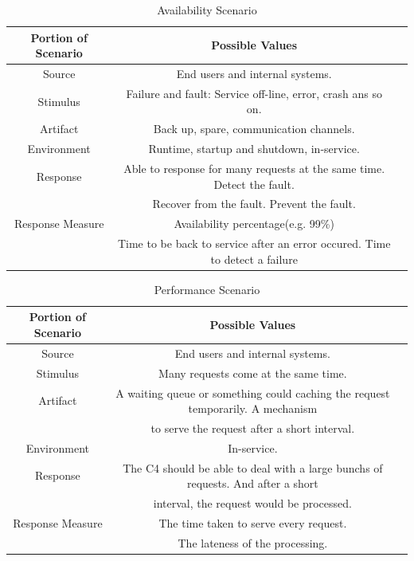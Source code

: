\documentclass{article}
\begin{document}
	\begin{center}
		\begin{table}[!htb]
		\begin{tabular}{ccc}
		\toprule  
		Portion of Scenario & Possible Values\\
		\midrule 
		Source & End users and internal systems.\\
		Stimulus & Failure and fault: Service off-line, error, crash ans so on.\\
		Artifact & Back up, spare, communication channels.\\
		Environment & Runtime, startup and shutdown, in-service.\\
		Response & Able to response for many requests at the same time. Detect the fault. \\
		& Recover from the fault. Prevent the fault. \\		
		Response Measure & Availability percentage(e.g. 99\%) \\
		& Time to be back to service after an error occured. Time to detect a failure \\
		\bottomrule
		\end{tabular}
		\caption{Availability Scenario}
		\end{table}
	\end{center}

	\begin{center}
		\begin{table}[!htb]
		\begin{tabular}{ccc}
		\toprule  
		Portion of Scenario & Possible Values\\
		\midrule 
		Source & End users and internal systems.\\
		Stimulus & Many requests come at the same time.\\
		Artifact & A waiting queue or something could caching the request temporarily. A mechanism  \\
		& to serve the request after a short interval.\\
		Environment & In-service. \\
		Response & The C4 should be able to deal with a large bunchs of requests. And after a short\\ 
		& interval, the request would be processed.\\
		Response Measure & The time taken to serve every request.\\
		& The lateness of the processing.\\
		\bottomrule
		\end{tabular}
		\caption{Performance Scenario}
		\end{table}
	\end{center}
\end{document}
